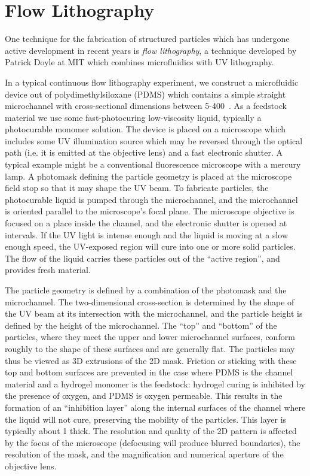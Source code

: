 \section{Flow Lithography}

One technique for the fabrication of structured particles which has undergone active development in recent years is 
\textit{flow lithography}, a technique developed by Patrick Doyle at MIT which combines microfluidics with 
UV lithography.


In a typical continuous flow lithography experiment, we construct a microfluidic device out of polydimethylsiloxane (PDMS)
which contains a simple straight microchannel with cross-sectional dimensions between 5-400~\microns. As a feedstock
material we use some fast-photocuring low-viscosity liquid, typically a photocurable monomer solution. The device is 
placed on a microscope which includes some UV illumination source which may be reversed through the optical path (i.e.
it is emitted at the objective lens) and a fast electronic shutter. A typical example might be a conventional 
fluorescence microscope with a mercury lamp.  A photomask defining the particle geometry is placed at the microscope
field stop so that it may shape the UV beam.
To fabricate particles, the photocurable liquid is pumped through the microchannel, and the microchannel is oriented
parallel to the microscope's focal plane. The microscope objective is focused on a place inside the channel, and the
electronic shutter is opened at intervals. If the UV light is intense enough and the liquid is moving at a slow enough speed,
the UV-exposed region will cure into one or more solid particles.  
The flow of the liquid carries these particles out of the ``active 
region'', and provides fresh material.

The particle geometry is defined by a combination of the photomask and the microchannel.  The two-dimensional cross-section
is determined by the shape of the UV beam at its intersection with the microchannel, and the particle height is defined by
the height of the microchannel. The ``top'' and ``bottom'' of the particles, where they meet the upper and lower
microchannel surfaces, conform roughly to the shape of these surfaces and are generally flat.
The particles may thus be viewed as 3D extrusions of the 2D mask.  Friction or sticking with these top and bottom
surfaces are prevented in the case where PDMS is the channel material and a hydrogel monomer is the feedstock: hydrogel
curing is inhibited by the presence of oxygen, and PDMS is oxygen permeable. This results in the formation of an 
``inhibition layer'' along the internal surfaces of the channel where the liquid will not cure, preserving the mobility 
of the particles. This layer is typically about 1 \microns thick.
The resolution and quality of the 2D pattern 
is affected by the focus of the microscope (defocusing will produce blurred boundaries), the resolution of the mask,
and the magnification and numerical aperture of the objective lens.  

